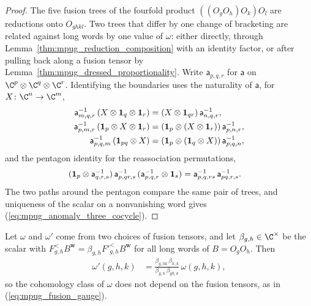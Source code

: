 \begin{proof}\leanok
    The five fusion trees of the fourfold product $((O_gO_h)O_k)O_l$ are
    reductions onto $O_{ghkl}$. Two trees that differ by one change of
    bracketing are related against long words by one value of $\omega$:
    either directly, through Lemma~\ref{thm:mpug_reduction_composition}
    with an identity factor, or after pulling back along a fusion tensor
    by Lemma~\ref{thm:mpug_dressed_proportionality}. Write
    $\mathsf a_{p,q,r}$ for $\mathsf a$ on $\C^p\otimes\C^q\otimes\C^r$.
    Identifying the boundaries uses the naturality of $\mathsf a$, for
    $X\colon\C^n\to\C^m$,
    \begin{align}
        \mathsf a^{-1}_{m,q,r}\,(X\otimes\mathbf 1_q\otimes\mathbf 1_r)
         & =(X\otimes\mathbf 1_{qr})\,\mathsf a^{-1}_{n,q,r},
        \notag                                                                  \\
        \mathsf a^{-1}_{p,m,r}\,(\mathbf 1_p\otimes X\otimes\mathbf 1_r)
         & =(\mathbf 1_p\otimes(X\otimes\mathbf 1_r))\,\mathsf a^{-1}_{p,n,r},
        \notag                                                                  \\
        \mathsf a^{-1}_{p,q,m}\,(\mathbf 1_{pq}\otimes X)
         & =(\mathbf 1_p\otimes(\mathbf 1_q\otimes X))\,\mathsf a^{-1}_{p,q,n},
        \notag
    \end{align}
    and the pentagon identity for the reassociation permutations,
    \begin{align}
        (\mathbf 1_p\otimes\mathsf a^{-1}_{q,r,s})\,\mathsf a^{-1}_{p,qr,s}\,
        (\mathsf a^{-1}_{p,q,r}\otimes\mathbf 1_s)
         & =\mathsf a^{-1}_{p,q,rs}\,\mathsf a^{-1}_{pq,r,s}.
        \notag
    \end{align}
    The two paths around the pentagon
    compare the same pair of trees, and uniqueness of the scalar on a
    nonvanishing word gives (\ref{eq:mpug_anomaly_three_cocycle}).
\end{proof}

\begin{lemma}
    \label{thm:mpug_anomaly_three_cocycle_gauge}
    \leanok
    Let $\omega$ and $\omega'$ come from two choices of fusion tensors, and
    let $\beta_{g,h}\in\C^\times$ be the scalar with
    $F^<_{g,h}B^{\mathbf w}=\beta_{g,h}F'^<_{g,h}B^{\mathbf w}$ for all long
    words of $B=O_gO_h$. Then
    \begin{align}
        \omega'(g,h,k)
         & =\frac{\beta_{g,hk}\,\beta_{h,k}}{\beta_{g,h}\,\beta_{gh,k}}
        \,\omega(g,h,k),
    \end{align}
    so the cohomology class of $\omega$ does not depend on the fusion
    tensors, as in (\ref{eq:mpug_fusion_gauge}).
\end{lemma}


